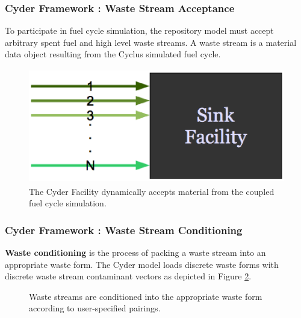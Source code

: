 \begin{frame}[ctb!]
  \frametitle{Cyder Framework : Waste Stream Acceptance}
  \footnotesize{
  
To participate in fuel cycle simulation, the repository model must accept arbitrary 
spent fuel and high level waste streams. A waste stream is a material data 
object resulting from the Cyclus simulated fuel cycle.  
  \begin{figure}[htbp!]
    \begin{center}
      \includegraphics[height=5cm]{./cyder/images/sinkfacility.eps}
    \end{center}
    \caption{ The Cyder Facility dynamically accepts material from the 
    coupled fuel cycle simulation.} 
    \label{fig:sinkfacility}
  \end{figure}
}
\end{frame}

\begin{frame}[ctb!]
  \frametitle{Cyder Framework : Waste Stream Conditioning}
  \footnotesize{

    \textbf{Waste conditioning} is the process of packing a waste stream into an appropriate 
waste form.  The Cyder model loads discrete waste forms with discrete waste 
stream contaminant vectors as depicted in Figure \ref{fig:ws_conditioning}.
  
\begin{figure}[htbp!]
\begin{center}
\def\svgwidth{.5\textwidth}

\end{center}
\caption{Waste streams are conditioned into the appropriate waste form 
according to user-specified pairings.}
\label{fig:ws_conditioning}
\end{figure}
}
\end{frame}

